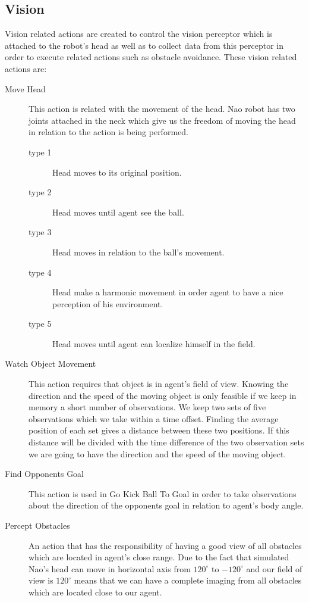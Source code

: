 \subsection{Vision}
Vision related actions are created to control the vision perceptor which is attached to the robot's head as well as to collect data from this perceptor in order to execute related actions such as obstacle avoidance. These vision related actions are:
\begin{description}
 \item[Move Head] This action is related with the movement of the head. Nao robot has two joints attached in the neck which give us the freedom of moving the head in relation to the action is being performed.
 \begin{description}
 \item[type 1] Head moves to its original position.
 \item[type 2] Head moves until agent see the ball.
 \item[type 3] Head moves in relation to the ball's movement.
 \item[type 4] Head make a harmonic movement in order agent to have a nice perception of his environment.
 \item[type 5] Head moves until agent can localize himself in the field.
 \end{description}
 \item[Watch Object Movement] This action requires that object is in agent's field of view. Knowing the direction and the speed of the moving object is only feasible if we keep in memory a short number of observations. We keep two sets of five observations which we take within a time offset. Finding the average position of each set gives a distance between these two positions. If this distance will be divided with the time difference of the two observation sets we are going to have the direction and the speed of the moving object.
 \item[Find Opponents Goal]This action is used in Go Kick Ball To Goal in order to take observations about the direction of the opponents goal in relation to agent's body angle.
 \item[Percept Obstacles]
 An action that has the responsibility of having a good view of all obstacles which are located in agent's close range. Due to the fact that simulated Nao's head can move in horizontal axis from $120^{\circ}$ to $-120^{\circ}$ and our field of view is $120^{\circ}$ means that we can have a complete imaging from all obstacles which are located close to our agent.

\end{description}
